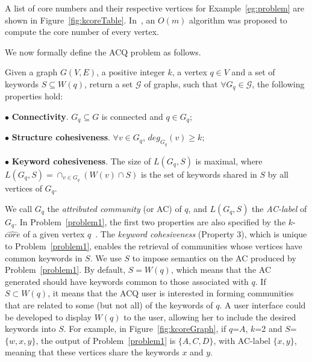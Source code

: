 A list of core numbers and their respective vertices for Example~\ref{eg:problem} are shown in Figure~\ref{fig:kcoreTable}. In~\cite{kcore2003}, an $O(m)$ algorithm was proposed to compute the core number of every vertex.



We now formally define the ACQ problem as follows.

\begin{problem}[ACQ]
\label{problem1}
Given a graph $G(V,E)$, a positive integer $k$, a vertex $q \in V$ and a set of keywords $S\subseteq W(q)$, return a set $\mathcal {G}$ of graphs, such that $\forall G_q \in \mathcal {G}$, the following properties hold:


\vspace{1ex}
$\bullet$ \textbf{Connectivity}. $G_q \subseteq G$ is connected and $q\in G_q$;

$\bullet$ \textbf{Structure cohesiveness}. $\forall$$v\in G_q$, $deg_{G_q}(v)\geq$$k$;

$\bullet$ \textbf{Keyword cohesiveness}. The size of $L(G_q, S)$ is maximal, where $L(G_q, S)=\cap_{v \in G_q}(W(v)\cap S)$ is the set of keywords shared in $S$ by all vertices of $G_q$.%
\end{problem}

We call $G_q$ the {\it attributed community} (or AC) of $q$, and $L(G_q, S)$ the {\it AC-label} of $G_q$. In Problem~\ref{problem1}, the first two properties are also specified by the $k$-$\widehat{core}$ of a given vertex $q$~\cite{KDD2010}. The {\it keyword cohesiveness} (Property 3), which is unique to Problem~\ref{problem1}, enables the retrieval of communities whose vertices have common keywords in $S$.  We use
$S$ to impose semantics on the AC produced by Problem~\ref{problem1}. By default, $S=W(q)$, which means that the AC generated should have keywords common to those associated with $q$. If $S \subset W(q)$, it means that the ACQ user is interested in forming communities that are related to some (but not all) of the keywords of $q$. A user interface could be developed to display $W(q)$ to the user, allowing her to include the desired keywords into $S$.  For example, in Figure~\ref{fig:kcoreGraph}, if $q$=$A$, $k$=2 and $S$=$\{w,x,y\}$, the output of Problem~\ref{problem1} is $\{A,C,D\}$, with AC-label $\{x,y\}$, meaning that these vertices share the keywords $x$ and $y$.


